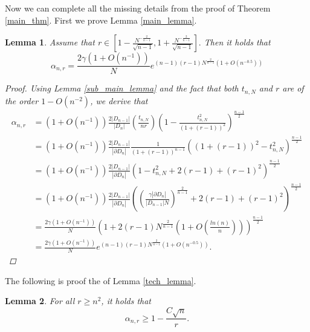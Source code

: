 \documentclass[10pt, twoside, leqno]{article}
\newtheorem*{lemmaa}{Lemma}
\theoremstyle{definition}
\numberwithin{equation}{section}
\newcommand{\be}{\begin{equation}}
\newcommand{\ee}{\end{equation}}
\newcommand{\NN}{N^{-\frac 2{n-1} }}
\begin{document}
Now we can complete all the missing details from the proof of Theorem \ref{main_thm}.
First we prove Lemma \ref{main_lemma}.
\begin{lemmaa}
	Assume that $ r \in [1-\frac{\NN}{\sqrt{n-1}}, 1+\frac{\NN}{\sqrt{n-1}}].$ Then it holds that
	\begin{equation}
	\alpha_{n,r}=\frac{2\gamma\left(1+O\left(n^{-1}\right)\right)}{N}e^{\left(n-1\right)\left(r-1\right)N^{\frac{2}{n-1}}\left(1+O\left(n^{-0.5}\right)\right)}
	\end{equation}
	\begin{proof} Using Lemma \ref{sub_main_lemma} and the fact that both $ t_{n,N}$ and $r $ are of the order $ 1-O\left(n^{-2}\right)$, we derive that
		\begin{equation*}
\begin{aligned}\alpha_{n,r} & =\left(1+O\left(n^{-1}\right)\right)\frac{2|D_{n-1}|}{|D_{n}|}\left(\frac{t_{n,N}}{nr}\right)\left(1-\frac{t_{n,N}^{2}}{\left(1+\left(r-1\right)\right)^{2}}\right)^{\frac{n-1}{2}}\\
& =\left(1+O\left(n^{-1}\right)\right)\frac{2|D_{n-1}|}{|\partial D_{n}|}\frac{1}{\left(1+\left(r-1\right)\right)^{n-1}}\left(\left(1+\left(r-1\right)\right)^{2}-t_{n,N}^{2}\right)^{\frac{n-1}{2}}\\
& =\left(1+O\left(n^{-1}\right)\right)\frac{2|D_{n-1}|}{|\partial D_{n}|}\left(1-t_{n,N}^{2}+2\left(r-1\right)+\left(r-1\right)^{2}\right)^{\frac{n-1}{2}}\\
& =\left(1+O\left(n^{-1}\right)\right)\frac{2|D_{n-1}|}{|\partial D_{n}|}\left(\left(\frac{\gamma|\partial D_{n}|}{|D_{n-1}|N}\right)^{\frac{2}{n-1}}+2\left(r-1\right)+\left(r-1\right)^{2}\right)^{\frac{n-1}{2}}\\
& =\frac{2\gamma\left(1+O\left(n^{-1}\right)\right)}{N}\left(1+2\left(r-1\right)N^{\frac{2}{n-1}}(1+O(\frac{ln\left(n\right)}{n}))\right)^{\frac{n-1}{2}}\\
& =\frac{2\gamma\left(1+O\left(n^{-1}\right)\right)}{N}e^{\left(n-1\right)\left(r-1\right)N^{\frac{2}{n-1}}\left(1+O\left(n^{-0.5}\right)\right)}.
\end{aligned}
		\end{equation*}
	\end{proof}
\end{lemmaa}
The following is proof the of Lemma \ref{tech_lemma}.
\begin{lemmaa}
For all $r \geq n^2$, it holds that
	\be
	\alpha_{n,r} \geq 1-\frac{C\sqrt{n}}{r}	.
	\ee
\end{lemmaa}
\end{document}
